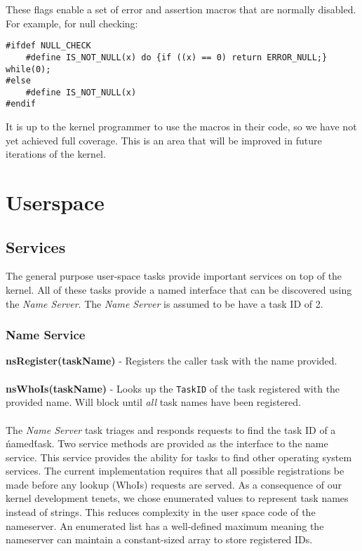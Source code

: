 \documentclass[twoside,a4paper]{refart}
\begin{document}
These flags enable a set of error and assertion macros that are normally disabled. For example, for null checking:

\begin{verbatim}
#ifdef NULL_CHECK
    #define IS_NOT_NULL(x) do {if ((x) == 0) return ERROR_NULL;} while(0);
#else
    #define IS_NOT_NULL(x)
#endif
\end{verbatim}

It is up to the kernel programmer to use the macros in their code, so we have not yet achieved full coverage. This is an area that will be improved in future iterations of the kernel.
\section{Userspace}
\subsection{Services}
The general purpose user-space tasks provide important services on top of the kernel. All of these tasks provide a named interface that can be discovered using the \textit{Name Server}. The \textit{Name Server} is assumed to be have a task ID of 2.

\subsubsection{Name Service}

\textbf{nsRegister(taskName)} - Registers the caller task with the name provided.\\\\
\textbf{nsWhoIs(taskName)} - Looks up the \verb~TaskID~ of the task registered with the provided name. Will block until \textit{all} task names have been registered.\\\\

The \textit{Name Server} task triages and responds requests to find the task ID of a \'named\' task. Two service methods are provided as the interface to the name service. This service provides the ability for tasks to find other operating system services. The current implementation requires that all possible registrations be made before any lookup (WhoIs) requests are served. As a consequence of our kernel development tenets, we chose enumerated values to represent task names instead of strings. This reduces complexity in the user space code of the nameserver. An enumerated list has a well-defined maximum meaning the nameserver can maintain a constant-sized array to store registered IDs.
\end{document}
